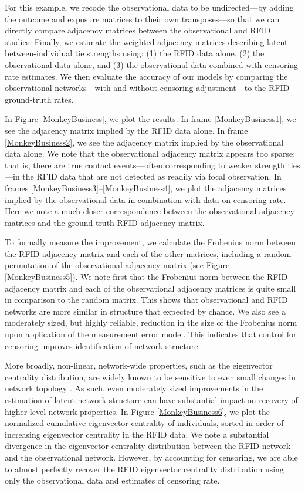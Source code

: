 \documentclass[Afour,sageh,times]{sagej}
\begin{document}
For this example, we recode the observational data to be undirected---by adding the outcome and exposure matrices to their own transposes---so that we can directly compare adjacency matrices between the observational and RFID studies. Finally, we estimate the weighted adjacency matrices describing latent between-individual tie strengths using: (1) the RFID data alone, (2) the observational data alone, and (3) the observational data combined with censoring rate estimates. We then evaluate the accuracy of our models by comparing the observational networks---with and without censoring adjustment---to the RFID ground-truth rates. 

In Figure \ref{MonkeyBusiness}, we plot the results. In frame \ref{MonkeyBusiness1}, we see the adjacency matrix implied by the RFID data alone. In frame \ref{MonkeyBusiness2}, we see the adjacency matrix implied by the observational data alone. We note that the observational adjacency matrix appears too sparse; that is, there are true contact events---often corresponding to weaker strength ties---in the RFID data that are not detected as readily via focal observation. In frames \ref{MonkeyBusiness3}--\ref{MonkeyBusiness4}, we plot the adjacency matrices implied by the observational data in combination with data on censoring rate. Here we note a much closer correspondence between the observational adjacency matrices and the ground-truth RFID adjacency matrix.

To formally measure the improvement, we calculate the Frobenius norm  \citep[see:][]{cui2016covariance} between the RFID adjacency matrix and each of the other matrices, including a random permutation of the observational adjacency matrix (see Figure \ref{MonkeyBusiness5}). We note first that the Frobenius norm between the RFID adjacency matrix and each of the observational adjacency matrices is quite small in comparison to the random matrix. This shows that observational and RFID networks are more similar in structure that expected by chance. We also see a moderately sized, but highly reliable, reduction in the size of the Frobenius norm upon application of the measurement error model. This indicates that control for censoring improves identification of network structure.

More broadly, non-linear, network-wide properties, such as the eigenvector centrality distribution, are widely known to be sensitive to even small changes in network topology \citep{cavallaro2024sensitivity}.  As such, even moderately sized improvements in the estimation of latent network structure can have substantial impact on recovery of higher level network properties. In Figure \ref{MonkeyBusiness6}, we plot the normalized cumulative eigenvector centrality of individuals, sorted in order of increasing eigenvector centrality in the RFID data. We note a substantial divergence in the eigenvector centrality distribution between the RFID network and the observational network. However, by accounting for censoring, we are able to almost perfectly recover the RFID eigenvector centrality distribution using only the observational data and estimates of censoring rate.
\end{document}
